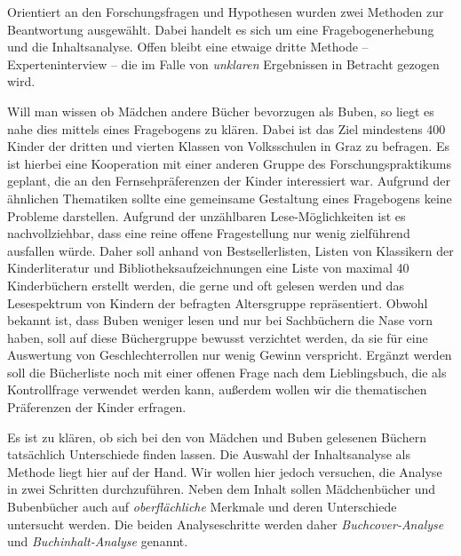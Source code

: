     Orientiert an den Forschungsfragen und Hypothesen wurden zwei Methoden zur
    Beantwortung ausgewählt. Dabei handelt es sich um eine Fragebogenerhebung
    und die Inhaltsanalyse. Offen bleibt eine etwaige dritte Methode --
    Experteninterview -- die im Falle von \emph{unklaren} Ergebnissen in
    Betracht gezogen wird.


    Will man wissen ob Mädchen andere Bücher bevorzugen als Buben, so liegt es
    nahe dies mittels eines Fragebogens zu klären. Dabei ist das Ziel mindestens
    400 Kinder der dritten und vierten Klassen von Volksschulen in Graz zu
    befragen. Es ist hierbei eine Kooperation mit einer anderen Gruppe des
    Forschungspraktikums geplant, die an den Fernsehpräferenzen der Kinder
    interessiert war. Aufgrund der ähnlichen Thematiken sollte eine gemeinsame
    Gestaltung eines Fragebogens keine Probleme darstellen. Aufgrund der
    unzählbaren Lese-Möglichkeiten ist es nachvollziehbar, dass eine reine
    offene Fragestellung nur wenig zielführend ausfallen würde. Daher soll
    anhand von Bestsellerlisten, Listen von Klassikern der Kinderliteratur und
    Bibliotheksaufzeichnungen eine Liste von maximal 40 Kinderbüchern erstellt
    werden, die gerne und oft gelesen werden und das Lesespektrum von Kindern
    der befragten Altersgruppe repräsentiert. Obwohl bekannt ist, dass Buben
    weniger lesen und nur bei Sachbüchern die Nase vorn haben, soll auf diese
    Büchergruppe bewusst verzichtet werden, da sie für eine Auswertung von
    Geschlechterrollen nur wenig Gewinn verspricht. Ergänzt werden soll die
    Bücherliste noch mit einer offenen Frage nach dem Lieblingsbuch, die als
    Kontrollfrage verwendet werden kann, außerdem wollen wir die thematischen
    Präferenzen der Kinder erfragen.


    Es ist zu klären, ob sich bei den von Mädchen und Buben gelesenen Büchern
    tatsächlich Unterschiede finden lassen. Die Auswahl der Inhaltsanalyse als
    Methode liegt hier auf der Hand. Wir wollen hier jedoch versuchen, die
    Analyse in zwei Schritten durchzuführen. Neben dem Inhalt sollen
    Mädchenbücher und Bubenbücher auch auf \emph{oberflächliche} Merkmale und
    deren Unterschiede untersucht werden. Die beiden Analyseschritte werden
    daher \emph{Buchcover-Analyse} und \emph{Buchinhalt-Analyse} genannt.


